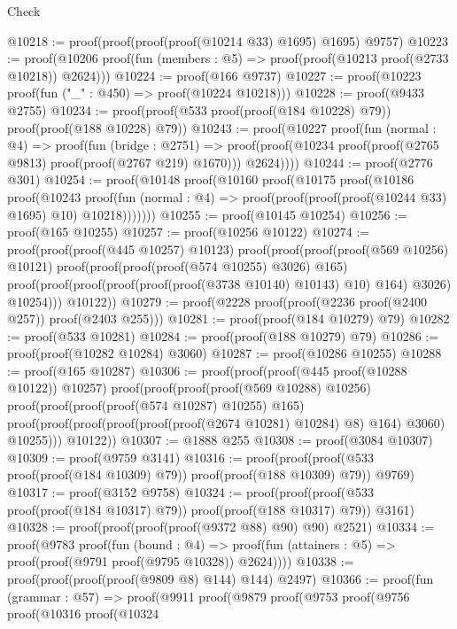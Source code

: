 \begin{lexlean}{Check}
\begin{coremodule}
@10218 := proof(proof(proof(proof(@10214 @33) @1695) @1695) @9757)
@10223 := proof(@10206 proof(fun (members : @5) => proof(proof(@10213 proof(@2733 @10218)) @2624)))
@10224 := proof(@166 @9737)
@10227 := proof(@10223 proof(fun ("_" : @450) => proof(@10224 @10218)))
@10228 := proof(@9433 @2755)
@10234 := proof(proof(@533 proof(proof(@184 @10228) @79)) proof(proof(@188 @10228) @79))
@10243 := proof(@10227
      proof(fun (normal : @4) =>
        proof(fun (bridge : @2751) =>
          proof(proof(@10234 proof(proof(@2765 @9813) proof(proof(@2767 @219) @1670))) @2624))))
@10244 := proof(@2776 @301)
@10254 := proof(@10148
      proof(@10160
          proof(@10175
              proof(@10186
                  proof(@10243
                      proof(fun (normal : @4) =>
                        proof(proof(proof(proof(@10244 @33) @1695) @10) @10218)))))))
@10255 := proof(@10145 @10254)
@10256 := proof(@165 @10255)
@10257 := proof(@10256 @10122)
@10274 := proof(proof(proof(@445 @10257) @10123)
      proof(proof(proof(proof(@569 @10256) @10121)
            proof(proof(proof(proof(@574 @10255) @3026) @165)
                proof(proof(proof(proof(proof(proof(@3738 @10140) @10143) @10) @164) @3026)
                    @10254)))
          @10122))
@10279 := proof(@2228 proof(proof(@2236 proof(@2400 @257)) proof(@2403 @255)))
@10281 := proof(proof(@184 @10279) @79)
@10282 := proof(@533 @10281)
@10284 := proof(proof(@188 @10279) @79)
@10286 := proof(proof(@10282 @10284) @3060)
@10287 := proof(@10286 @10255)
@10288 := proof(@165 @10287)
@10306 := proof(proof(proof(@445 proof(@10288 @10122)) @10257)
      proof(proof(proof(proof(@569 @10288) @10256)
            proof(proof(proof(proof(@574 @10287) @10255) @165)
                proof(proof(proof(proof(proof(proof(@2674 @10281) @10284) @8) @164) @3060) @10255)))
          @10122))
@10307 := @1888 @255
@10308 := proof(@3084 @10307)
@10309 := proof(@9759 @3141)
@10316 := proof(proof(proof(@533 proof(proof(@184 @10309) @79)) proof(proof(@188 @10309) @79))
      @9769)
@10317 := proof(@3152 @9758)
@10324 := proof(proof(proof(@533 proof(proof(@184 @10317) @79)) proof(proof(@188 @10317) @79))
      @3161)
@10328 := proof(proof(proof(proof(@9372 @88) @90) @90) @2521)
@10334 := proof(@9783
      proof(fun (bound : @4) =>
        proof(fun (attainers : @5) => proof(proof(@9791 proof(@9795 @10328)) @2624))))
@10338 := proof(proof(proof(proof(@9809 @8) @144) @144) @2497)
@10366 := proof(fun (grammar : @57) =>
    proof(@9911
        proof(@9879
            proof(@9753
                proof(@9756
                    proof(@10316
                        proof(@10324

\end{coremodule}
\end{lexlean}
